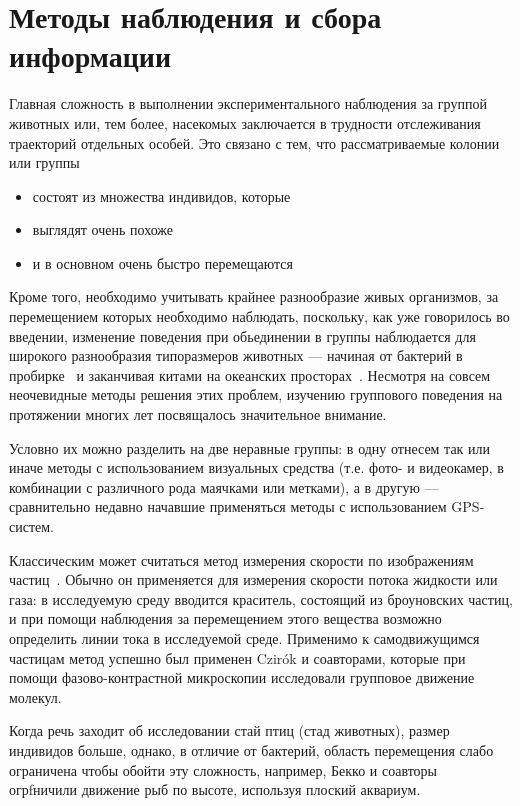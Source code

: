 \section{Методы наблюдения и сбора информации} %
\label{sec:ExperimentalMethods}
	Главная сложность в выполнении экспериментального наблюдения за группой животных или, тем более, насекомых заключается в трудности отслеживания траекторий отдельных особей. Это связано с тем, что рассматриваемые колонии или группы
	\begin{itemize}
		\item  состоят из множества индивидов, которые
		\item выглядят очень похоже
		\item и в основном очень быстро перемещаются
	\end{itemize}
	Кроме того, необходимо учитывать крайнее разнообразие живых организмов, за перемещением которых необходимо наблюдать, поскольку, как уже говорилось во введении, изменение поведения при обьединении в группы наблюдается для широкого разнообразия типоразмеров животных --- начиная от бактерий в пробирке~\cite{csahok1997,keller1971} и заканчивая китами на океанских просторах~\cite{makris2009}.
	Несмотря на совсем неочевидные методы решения этих проблем, изучению группового поведения на протяжении многих лет посвящалось значительное внимание.

	Условно их можно разделить на две неравные группы: в одну отнесем так или иначе методы с использованием визуальных средства (т.е. фото- и видеокамер, в комбинации с различного рода маячками или метками), а в другую --- сравнительно недавно начавшие применяться методы с использованием GPS-систем.

	Классическим может считаться метод измерения скорости по изображениям частиц~\cite{raffel2007}. Обычно он применяется для измерения скорости потока жидкости или газа: в исследуемую среду вводится краситель, состоящий из броуновских частиц, и при помощи наблюдения за перемещением этого вещества возможно определить линии тока в исследуемой среде. Применимо к самодвижущимся частицам метод успешно был применен  Czir\'{o}k и соавторами\cite{csahok1997}, которые при помощи фазово-контрастной микроскопии исследовали групповое движение молекул.

	Когда речь заходит об исследовании стай птиц (стад животных), размер индивидов больше, однако, в отличие от бактерий, область перемещения слабо ограничена чтобы обойти эту сложность, например, Бекко и соавторы~\cite{becco2006} огрfничили движение рыб по высоте, используя плоский аквариум.

